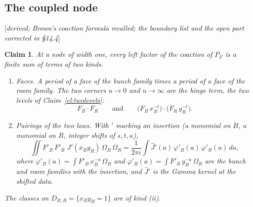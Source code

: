 \documentclass[11pt]{article}
\newcommand{\status}[1]{\hfill{\small[\textit{#1}]}}
\theoremstyle{plain}
\newtheorem{claim}{Claim}[section]
\theoremstyle{remark}
\begin{document}
\subsection{The coupled node}\status{derived; Brown's coaction formula recalled; the boundary list and the open part corrected in \S14.4}

\begin{claim}\label{cl:nodeclosure}
At a node of width one, every left factor of the coaction of $P_F$ is a finite sum of terms of two kinds.
\begin{enumerate}[label=(\roman*)]
\item \emph{Faces.} A period of a face of the bunch family times a period of a face of the room family. The two corners $u\to0$ and $u\to\infty$ are the hinge term, the two levels of Claim~\ref{cl:twolevels}:
\[
F_B\cdot F_R\qquad\text{and}\qquad\big(F_B\,x_B^{-t}\big)\cdot\big(F_R\,y_R^{-t}\big).
\]
\item \emph{Pairings of the two laws.} With $'$ marking an insertion (a monomial on $B$, a monomial on $R$, integer shifts of $s,t,\kappa$),
\[
\iint F'_B\,F'_R\;J'(x_By_R)\,\Omega_B\,\Omega_R=\frac1{2\pi i}\int\hat J'(a)\,\varphi'_B(a)\,\varphi'_R(a)\,da,
\]
where $\varphi'_B(a)=\int F'_B\,x_B^{-a}\,\Omega_B$ and $\varphi'_R(a)=\int F'_R\,y_R^{-a}\,\Omega_R$ are the bunch and room families with the insertion, and $\hat J'$ is the Gamma kernel at the shifted data.
\end{enumerate}
The classes on $D_{B,R}=\{x_By_R=1\}$ are of kind (ii).
\end{claim}
\end{document}
